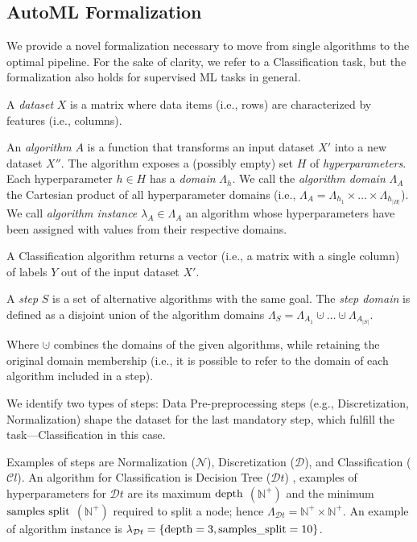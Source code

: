 \subsection{AutoML Formalization}
We provide a novel formalization necessary to move from single algorithms to the optimal pipeline.
For the sake of clarity, we refer to a Classification task, but the formalization also holds for supervised ML tasks in general. %

\begin{definition}[Dataset]
A \emph{dataset} $X$ is a matrix where data items (i.e., rows) are characterized by features (i.e., columns).
\end{definition}

\begin{definition}[Algorithm]
An \emph{algorithm} $A$ is a function that transforms an input dataset $X'$ into a new dataset $X''$.
The algorithm exposes a (possibly empty) set $H$ of \emph{hyperparameters}.
Each hyperparameter $h \in H$ has a \emph{domain} $\Lambda_h$.
We call the \emph{algorithm domain} $\Lambda_A$ the Cartesian product of all hyperparameter domains (i.e., $\Lambda_A = \Lambda_{h_1} \times \ldots \times \Lambda_{h_{|H|}}$).
We call \emph{algorithm instance} $\lambda_A \in \Lambda_A$ an algorithm whose hyperparameters have been assigned with values from their respective domains.
\end{definition}

A Classification algorithm returns a vector (i.e., a matrix with a single column) of labels $Y$ out of the input dataset $X'$.

\begin{definition}[Step]
A \emph{step} $S$ is a set of alternative algorithms with the same goal.
The \emph{step domain} is defined as a disjoint union of the algorithm domains $\Lambda_S = \Lambda_{A_1} \cupdot \ldots \cupdot \Lambda_{A_{|S|}}$.
\end{definition}

Where $\cupdot$ combines the domains of the given algorithms, while retaining the original domain membership (i.e., it is possible to refer to the domain of each algorithm included in a step).

We identify two types of steps: Data Pre-preprocessing steps (e.g., Discretization, Normalization) shape the dataset for the last mandatory step, which fulfill the task---Classification in this case.

\begin{example}
Examples of steps are Normalization ($\mathcal{N}$), Discretization ($\mathcal{D}$), and Classification ($\mathcal{C}l$). 
An algorithm for Classification is Decision Tree  ($\mathcal{D}t$) \cite{DBLP:books/wa/BreimanFOS84},
examples of hyperparameters for $\mathcal{D}t$ are its maximum $\textup{depth}$ $(\mathbb{N}^+)$ and the minimum $\textup{samples split}$ $(\mathbb{N}^+)$ required to split a node; hence $\Lambda_{\mathcal{D}t} = \mathbb{N}^+ \times \mathbb{N}^+$.
An example of algorithm instance is $\lambda_{\mathcal{D}t}= \{ \textup{depth}=3,\textup{samples\_split}=10 \}$.
\end{example}


